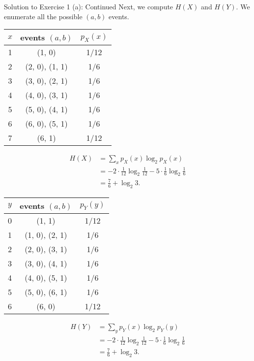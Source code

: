 \documentclass[aspectratio=169]{beamer}
\newcommand{\HX}{H(X)}
\newcommand{\HY}{H(Y)}
\begin{document}
\begin{frame}{Solution to Exercise 1 (a): Continued}
	\small
	Next, we compute $\HX$ and $\HY$. We enumerate all the possible $(a, b)$ events.
	\vspace{10pt}
	 
	\begin{minipage}{0.49\textwidth}
		\centering
		\begin{tabular}{c c c}
			\hline
			$x$ & events $(a, b)$ & $p_X(x)$ \\
			\hline
			1 & (1, 0) & 1/12 \\
			2 & (2, 0), (1, 1) & 1/6 \\
			3 & (3, 0), (2, 1) & 1/6 \\
			4 & (4, 0), (3, 1) & 1/6 \\
			5 & (5, 0), (4, 1) & 1/6 \\
			6 & (6, 0), (5, 1) & 1/6 \\
			7 & (6, 1) & 1/12 \\
			\hline
		\end{tabular}
		
		\begin{align*}
			\HX &= \sum_x p_X(x) \log_2 p_X(x) \\
				&= -2 \cdot \frac{1}{12} \log_2 \frac{1}{12} - 5\cdot \frac{1}{6} \log_2 \frac{1}{6} \\
				&= \frac{7}{6} + \log_2 3.
		\end{align*}
	\end{minipage}
	\hfill
	\begin{minipage}{0.49\textwidth}
		\centering
		\begin{tabular}{c c c}
			\hline
			$y$ & events $(a, b)$ & $p_Y(y)$ \\
			\hline
			0 & (1, 1) & 1/12 \\
			1 & (1, 0), (2, 1) & 1/6 \\
			2 & (2, 0), (3, 1) & 1/6 \\
			3 & (3, 0), (4, 1) & 1/6 \\
			4 & (4, 0), (5, 1) & 1/6 \\
			5 & (5, 0), (6, 1) & 1/6 \\
			6 & (6, 0) & 1/12 \\
			\hline
		\end{tabular}
		
		\begin{align*}
			\HY &= \sum_y p_Y(x) \log_2 p_Y(y) \\
				&= -2 \cdot \frac{1}{12} \log_2 \frac{1}{12} - 5\cdot \frac{1}{6} \log_2 \frac{1}{6} \\
				&= \frac{7}{6} + \log_2 3.
		\end{align*}
	\end{minipage}

\end{frame}
\end{document}
